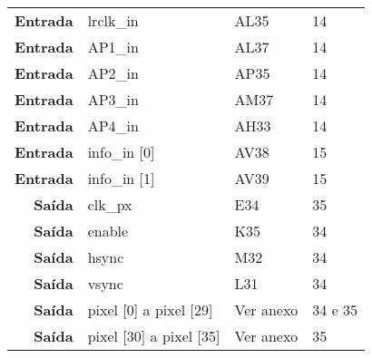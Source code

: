 \begin{table}[h!]
\begin{tabular}{rlll}
		\multicolumn{1}{r|}{\textbf{Entrada}} & lrclk\_in                             & AL35                                     & 14                                         \\
		\multicolumn{1}{r|}{\textbf{Entrada}} & AP1\_in                               & AL37                                     & 14                                         \\
		\multicolumn{1}{r|}{\textbf{Entrada}} & AP2\_in                               & AP35                                     & 14                                         \\
		\multicolumn{1}{r|}{\textbf{Entrada}} & AP3\_in                               & AM37                                     & 14                                         \\
		\multicolumn{1}{r|}{\textbf{Entrada}} & AP4\_in                               & AH33                                     & 14                                         \\
		\multicolumn{1}{r|}{\textbf{Entrada}} & info\_in {[}0{]}                      & AV38                                     & 15                                         \\
		\multicolumn{1}{r|}{\textbf{Entrada}} & info\_in {[}1{]}                      & AV39                                     & 15                                         \\
		\multicolumn{1}{r|}{\textbf{Saída}}   & clk\_px                               & E34                                      & 35                                         \\
		\multicolumn{1}{r|}{\textbf{Saída}}   & enable                                & K35                                      & 34                                         \\
		\multicolumn{1}{r|}{\textbf{Saída}}   & hsync                                 & M32                                      & 34                                         \\
		\multicolumn{1}{r|}{\textbf{Saída}}   & vsync                                 & L31                                      & 34                                         \\
		\multicolumn{1}{r|}{\textbf{Saída}}   & pixel {[}0{]} a pixel {[}29{]}        & Ver anexo                                & 34 e 35                                    \\
		\multicolumn{1}{r|}{\textbf{Saída}}   & pixel {[}30{]} a pixel {[}35{]}       & Ver anexo                                & 35                                         \\

\end{tabular}
\end{table}
